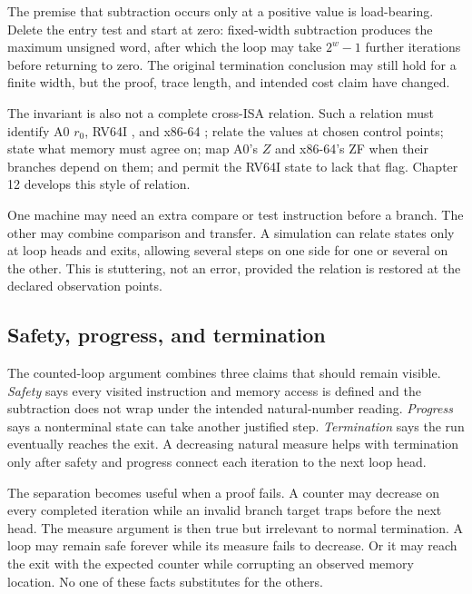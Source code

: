 The premise that subtraction occurs only at a positive value is load-bearing.
Delete the entry test and start at zero: fixed-width subtraction produces the
maximum unsigned word, after which the loop may take \(2^w-1\) further
iterations before returning to zero. The original termination conclusion may
still hold for a finite width, but the proof, trace length, and intended cost
claim have changed.

The invariant is also not a complete cross-ISA relation. Such a relation must
identify A0 \(r_0\), RV64I , and x86-64 ; relate the values
at chosen control points; state what memory must agree on; map A0's \(Z\) and
x86-64's ZF when their branches depend on them; and permit the RV64I state to
lack that flag. Chapter 12 develops this style of relation.

\begin{goingdeeper}[title={Stuttering between related control points}]
One machine may need an extra compare or test instruction before a branch.
The other may combine comparison and transfer. A simulation can relate states
only at loop heads and exits, allowing several steps on one side for one or
several on the other. This is stuttering, not an error, provided the relation
is restored at the declared observation points.
\end{goingdeeper}

\subsection{Safety, progress, and termination}

The counted-loop argument combines three claims that should remain visible.
\emph{Safety} says every visited instruction and memory access is defined and
the subtraction does not wrap under the intended natural-number reading.
\emph{Progress} says a nonterminal state can take another justified step.
\emph{Termination} says the run eventually reaches the exit. A decreasing
natural measure helps with termination only after safety and progress connect
each iteration to the next loop head.

The separation becomes useful when a proof fails. A counter may decrease on
every completed iteration while an invalid branch target traps before the next
head. The measure argument is then true but irrelevant to normal termination.
A loop may remain safe forever while its measure fails to decrease. Or it may
reach the exit with the expected counter while corrupting an observed memory
location. No one of these facts substitutes for the others.

